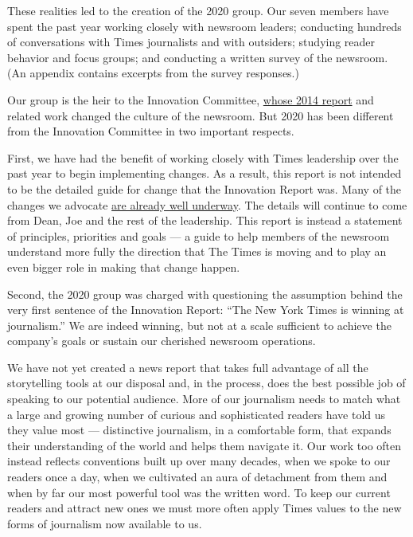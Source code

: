 These realities led to the creation of the 2020 group. Our seven members
have spent the past year working closely with newsroom leaders;
conducting hundreds of conversations with Times journalists and with
outsiders; studying reader behavior and focus groups; and conducting a
written survey of the newsroom. (An appendix contains excerpts from the
survey responses.)

Our group is the heir to the Innovation Committee,
\href{http://www.niemanlab.org/2014/05/the-leaked-new-york-times-innovation-report-is-one-of-the-key-documents-of-this-media-age/}{whose
2014 report} and related work changed the culture of the newsroom. But
2020 has been different from the Innovation Committee in two important
respects.

First, we have had the benefit of working closely with Times leadership
over the past year to begin implementing changes. As a result, this
report is not intended to be the detailed guide for change that the
Innovation Report was. Many of the changes we advocate
\href{http://www.nytco.com/press/blog/}{are already well underway}. The
details will continue to come from Dean, Joe and the rest of the
leadership. This report is instead a statement of principles, priorities
and goals --- a guide to help members of the newsroom understand more
fully the direction that The Times is moving and to play an even bigger
role in making that change happen.

Second, the 2020 group was charged with questioning the assumption
behind the very first sentence of the Innovation Report: ``The New York
Times is winning at journalism.'' We are indeed winning, but not at a
scale sufficient to achieve the company's goals or sustain our cherished
newsroom operations.

We have not yet created a news report that takes full advantage of all
the storytelling tools at our disposal and, in the process, does the
best possible job of speaking to our potential audience. More of our
journalism needs to match what a large and growing number of curious and
sophisticated readers have told us they value most --- distinctive
journalism, in a comfortable form, that expands their understanding of
the world and helps them navigate it. Our work too often instead
reflects conventions built up over many decades, when we spoke to our
readers once a day, when we cultivated an aura of detachment from them
and when by far our most powerful tool was the written word. To keep our
current readers and attract new ones we must more often apply Times
values to the new forms of journalism now available to us.

